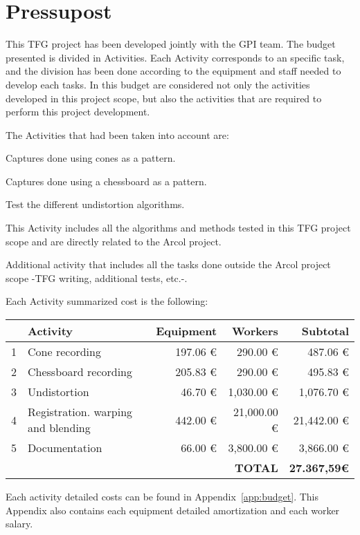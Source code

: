 \chapter{Pressupost}\label{chapter:pressupost}
This TFG project has been developed jointly with the GPI team. The budget presented is divided in Activities. Each Activity corresponds to an specific task, and the division has been done according to the equipment and staff needed to develop each tasks. In this budget are considered not only the activities developed in this project scope, but also the activities that are required to perform this project development. 

The Activities that had been taken into account are:
\begin{description}[font=\normalfont\textsl]
\item[Activity 1: Recording I.] Captures done using cones as a pattern.
\item[Activity 2: Recording II.] Captures done using a chessboard as a pattern.
\item[Activity 3: Undistortion.] Test the different undistortion algorithms.
\item[Activity 4: Registration, warping and blending.] This Activity includes all the algorithms and methods tested in this TFG project scope and are directly related to the Arcol project.
\item[Activity 5: Documentation.] Additional activity that includes all the tasks done outside the Arcol project scope -TFG writing, additional tests, etc.-.

\end{description}

Each Activity summarized cost is the following:

\begin{table}[H]
\begin{tabular}{l l r r r}
&Activity&Equipment&Workers&Subtotal\\
\hline\hline
1&Cone recording&197.06 \euro{}&290.00 \euro{}&487.06 \euro\\
2&Chessboard recording&205.83 \euro{}&290.00 \euro{}&495.83 \euro \\
3&Undistortion&46.70 \euro{}&1,030.00 \euro{}&1,076.70 \euro\\
4&Registration. warping and blending&442.00 \euro{}&21,000.00 \euro{}&21,442.00 \euro\\
5&Documentation&66.00 \euro{}&3,800.00 \euro{}&3,866.00 \euro\\[0.3cm]
& & &  \textbf{TOTAL} & \textbf{27.367,59\euro }
\end{tabular}
\end{table}

Each activity detailed costs can be found in Appendix~\ref{app:budget}. This Appendix also contains each equipment detailed amortization and each worker salary.


